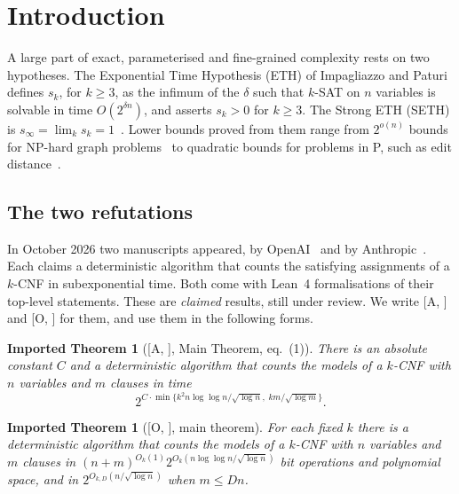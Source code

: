 \documentclass[10pt]{amsart}
\theoremstyle{plain}
\newtheorem{importedtheorem}[theorem]{Imported Theorem}
\theoremstyle{definition}
\theoremstyle{remark}
\numberwithin{equation}{section}
\newcommand{\A}[1][]{\textup{[A\if\relax\detokenize{#1}\relax\else, #1\fi]}}
\newcommand{\Oa}[1][]{\textup{[O\if\relax\detokenize{#1}\relax\else, #1\fi]}}
\begin{document}
\maketitle

\section{Introduction}\label{sec:intro}

A large part of exact, parameterised and fine-grained complexity rests on two hypotheses. The
Exponential Time Hypothesis (ETH) of Impagliazzo and Paturi~\cite{IP99,ImpagliazzoPaturi01} defines
$s_k$, for $k\ge3$, as the infimum of the $\delta$ such that $k$-SAT on $n$ variables is solvable in
time $O(2^{\delta n})$, and asserts $s_k>0$ for $k\ge3$. The Strong ETH (SETH) is
$s_\infty=\lim_k s_k=1$~\cite{ImpagliazzoPaturi01}. Lower bounds proved from them range from
$2^{o(n)}$ bounds for NP-hard graph problems~\cite{IPZ01,LMS11} to quadratic bounds for problems in
P, such as edit distance~\cite{BI18}.

\subsection{The two refutations}
In October 2026 two manuscripts appeared, by OpenAI~\cite{OpenAI26} and by
Anthropic~\cite{Anthropic26}. Each claims a deterministic algorithm that counts the satisfying
assignments of a $k$-CNF in subexponential time. Both come with Lean~4 formalisations of their
top-level statements. These are \emph{claimed} results, still under review. We write \A{} and \Oa{}
for them, and use them in the following forms.

\begin{importedtheorem}[{\A, Main Theorem, eq.~(1)}]\label{imp:A}
There is an absolute constant $C$ and a deterministic algorithm that counts the models of a $k$-CNF
with $n$ variables and $m$ clauses in time
\[
  2^{C\cdot\min\{k^2 n\log\log n/\sqrt{\log n},\;km/\sqrt{\log m}\}}.
\]
\end{importedtheorem}

\begin{importedtheorem}[{\Oa, main theorem}]\label{imp:O}
For each fixed $k$ there is a deterministic algorithm that counts the models of a $k$-CNF with $n$
variables and $m$ clauses in $(n+m)^{O_k(1)}2^{O_k(n\log\log n/\sqrt{\log n})}$ bit operations and
polynomial space, and in $2^{O_{k,D}(n/\sqrt{\log n})}$ when $m\le Dn$.
\end{importedtheorem}
\end{document}
